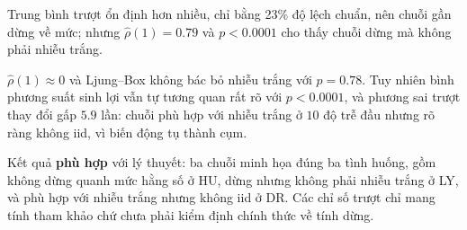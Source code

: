  Trung bình trượt ổn định hơn nhiều, chỉ bằng 23\% độ lệch chuẩn, nên chuỗi gần dừng về mức; nhưng $\hat\rho(1)=0.79$ và $p<0.0001$ cho thấy chuỗi dừng mà không phải nhiễu trắng.

 $\hat\rho(1)\approx0$ và Ljung--Box không bác bỏ nhiễu trắng với $p=0.78$. Tuy nhiên bình phương suất sinh lợi vẫn tự tương quan rất rõ với $p<0.0001$, và phương sai trượt thay đổi gấp $5.9$ lần: chuỗi phù hợp với nhiễu trắng ở $10$ độ trễ đầu nhưng rõ ràng không iid, vì biến động tụ thành cụm.

 Kết quả \textbf{phù hợp} với lý thuyết: ba chuỗi minh họa đúng ba tình huống, gồm không dừng quanh mức hằng số ở HU, dừng nhưng không phải nhiễu trắng ở LY, và phù hợp với nhiễu trắng nhưng không iid ở DR. Các chỉ số trượt chỉ mang tính tham khảo chứ chưa phải kiểm định chính thức về tính dừng.

